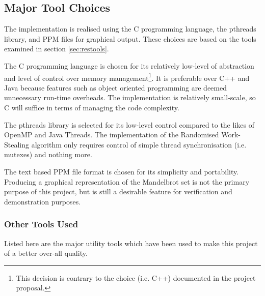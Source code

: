 \subsection*{Major Tool Choices}

The implementation is realised using the C programming language, the pthreads library, and PPM files for graphical output.
These choices are based on the tools examined in section \ref{sec:restools}.

The C programming language is chosen for its relatively low-level of abstraction and level of control over memory management\footnote{
This decision is contrary to the choice (i.e. C++) documented in the project proposal.}.
It is preferable over C++ and Java because features such as object oriented programming are deemed unnecessary run-time overheads.
The implementation is relatively small-scale, so C will suffice in terms of managing the code complexity.

The pthreads library is selected for its low-level control compared to the likes of OpenMP and Java Threads.
The implementation of the Randomised Work-Stealing algorithm only requires control of simple thread synchronisation (i.e. mutexes)
and nothing more. 

The text based PPM file format is chosen for its simplicity and portability. Producing a graphical representation of the Mandelbrot set is not
the primary purpose of this project, but is still a desirable feature for verification and demonstration purposes.

\subsubsection*{Other Tools Used}

Listed here are the major utility tools which have been used to make this project of a better over-all 
quality. 


